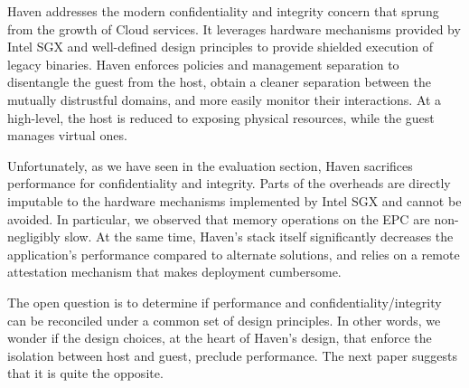 %
Haven addresses the modern confidentiality and integrity concern that sprung from the growth of Cloud services.
It leverages hardware mechanisms provided by Intel SGX and well-defined design principles to provide shielded execution of legacy binaries.
Haven enforces policies and management separation to disentangle the guest from the host, obtain a cleaner separation between the mutually distrustful domains, and more easily monitor their interactions.
At a high-level, the host is reduced to exposing physical resources, while the guest manages virtual ones.

Unfortunately, as we have seen in the evaluation section, Haven sacrifices performance for confidentiality and integrity.
Parts of the overheads are directly imputable to the hardware mechanisms implemented by Intel SGX and cannot be avoided.
In particular, we observed that memory operations on the EPC are non-negligibly slow.
At the same time, Haven's stack itself significantly decreases the application's performance compared to alternate solutions, and relies on a remote attestation mechanism that makes deployment cumbersome.

The open question is to determine if performance and confidentiality/integrity can be reconciled under a common set of design principles.
In other words, we wonder if the design choices, at the heart of Haven's design, that enforce the isolation between host and guest, preclude performance.
The next paper suggests that it is quite the opposite.